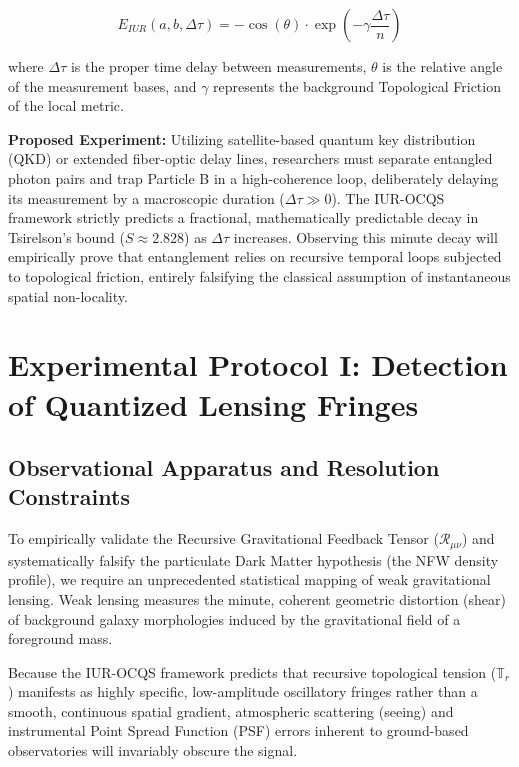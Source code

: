 \documentclass[12pt,openany]{book}
\begin{document}
\begin{equation}
E_{IUR}(a,b,\Delta\tau) = -\cos(\theta) \cdot \exp\left(-\gamma \frac{\Delta\tau}{n}\right)
\end{equation}

where $\Delta\tau$ is the proper time delay between measurements, $\theta$ is the relative angle of the measurement bases, and $\gamma$ represents the background Topological Friction of the local metric.

\textbf{Proposed Experiment:} Utilizing satellite-based quantum key distribution (QKD) or extended fiber-optic delay lines, researchers must separate entangled photon pairs and trap Particle B in a high-coherence loop, deliberately delaying its measurement by a macroscopic duration ($\Delta\tau \gg 0$). The IUR-OCQS framework strictly predicts a fractional, mathematically predictable decay in Tsirelson's bound ($S \approx 2.828$) as $\Delta\tau$ increases. Observing this minute decay will empirically prove that entanglement relies on recursive temporal loops subjected to topological friction, entirely falsifying the classical assumption of instantaneous spatial non-locality.

\chapter[Experimental Protocol I]{Experimental Protocol I: Detection of Quantized Lensing Fringes}

\section{Observational Apparatus and Resolution Constraints}
To empirically validate the Recursive Gravitational Feedback Tensor ($\mathcal{R}_{\mu\nu}$) and systematically falsify the particulate Dark Matter hypothesis (the NFW density profile), we require an unprecedented statistical mapping of weak gravitational lensing. Weak lensing measures the minute, coherent geometric distortion (shear) of background galaxy morphologies induced by the gravitational field of a foreground mass.

Because the IUR-OCQS framework predicts that recursive topological tension ($\mathbb{T}_r$) manifests as highly specific, low-amplitude oscillatory fringes rather than a smooth, continuous spatial gradient, atmospheric scattering (seeing) and instrumental Point Spread Function (PSF) errors inherent to ground-based observatories will invariably obscure the signal. 
\end{document}
